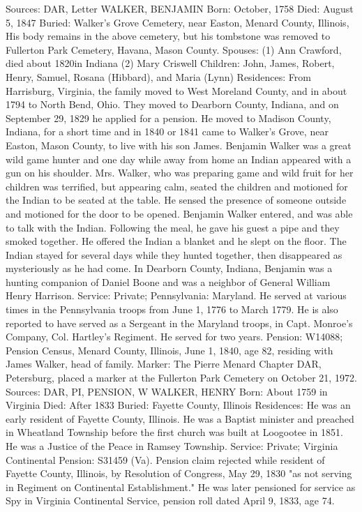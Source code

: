 Sources: DAR, Letter 
WALKER, BENJAMIN 
Born: October, 1758 
Died: August 5, 1847 
Buried: Walker's Grove Cemetery, near Easton, Menard County, Illinois, His body remains in the above cemetery, but his tombstone was removed to Fullerton Park Cemetery, Havana, Mason County. 
Spouses:  (1) Ann Crawford, died about 1820in Indiana 
	  (2) Mary Criswell
Children: John, James, Robert, Henry, Samuel, Rosana (Hibbard), and Maria (Lynn) 
Residences: From Harrisburg, Virginia, the family moved to West Moreland County, and in about 1794 to North Bend, Ohio. They moved to Dearborn County, Indiana, and on September 29, 1829 he applied for a pension. He moved to Madison County, Indiana, for a short time and in 1840 or 1841 came to Walker's Grove, near Easton, Mason County, to live with his son James. Benjamin Walker was a great wild game hunter and one day while away from home an Indian appeared with a gun on his shoulder. Mrs. Walker, who was preparing game and wild fruit for her children was terrified, but appearing calm, seated the children and motioned for the Indian to be seated at the table. He sensed the presence of someone outside and mo­tioned for the door to be opened. Benjamin Walker entered, and was able to talk with the Indian. Following the meal, he gave his guest a pipe and they smoked together. He offered the Indian a blanket and he slept on the floor. The Indian stayed for several days while they hunted together, then disappeared as mysteriously as he had come. In Dearborn County, Indiana, Benjamin was a hunting companion of Daniel Boone and was a neighbor of General William Henry Harrison. 
Service: Private; Pennsylvania: Maryland. He served at various times in the Pennsylvania troops from June 1, 1776 to March 1779. He is also reported to have served as a Sergeant in the Maryland troops, in Capt. Monroe's Com­pany, Col. Hartley's Regiment. He served for two years. 
Pension: W14088; Pension Census, Menard County, Illinois, June 1, 1840, age 82, residing with James Walker, head of family. 
Marker: The Pierre Menard Chapter DAR, Petersburg, placed a marker at the Fullerton Park Cemetery on October 21, 1972. 
Sources: DAR, PI, PENSION, W 
WALKER, HENRY 
Born: About 1759 in Virginia 
Died: After 1833 
Buried: Fayette County, Illinois 
Residences: He was an early resident of Fayette County, Illinois. He was a Baptist minister and preached in Wheatland Township before the first church was built at Loogootee in 1851. He was a Justice of the Peace in Ramsey Township. 
Service: Private; Virginia Continental 
Pension: S31459 (Va). Pension claim rejected while resident of Fayette County, Illinois, by Resolution of Congress, May 29, 1830 "as not serving in Regiment on Continental Establishment." He was later pensioned for service as Spy in Virginia Continental Service, pension roll dated April 9, 1833, age 74. 
